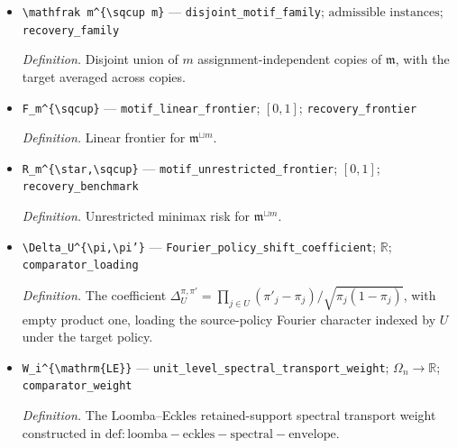 \documentclass{article}
\begin{document}
\begin{itemize}
  \par\smallskip\noindent\emph{Definition.} Positive one-motif posterior ambiguity under \(\nu_{\mathfrak m}\).
  \item \texttt{\textbackslash{}\allowbreak{}mathfrak m\textasciicircum{}\{\textbackslash{}\allowbreak{}sqcup m\}\allowbreak{}} --- \texttt{disjoint\_\allowbreak{}motif\_\allowbreak{}family}; \(\text{admissible instances}\); \texttt{recovery\_\allowbreak{}family}
  \par\smallskip\noindent\emph{Definition.} Disjoint union of \(m\) assignment-independent copies of \(\mathfrak m\), with the target averaged across copies.
  \item \texttt{F\_\allowbreak{}m\textasciicircum{}\{\textbackslash{}\allowbreak{}sqcup\}\allowbreak{}} --- \texttt{motif\_\allowbreak{}linear\_\allowbreak{}frontier}; \([0,1]\); \texttt{recovery\_\allowbreak{}frontier}
  \par\smallskip\noindent\emph{Definition.} Linear frontier for \(\mathfrak m^{\sqcup m}\).
  \item \texttt{R\_\allowbreak{}m\textasciicircum{}\{\textbackslash{}\allowbreak{}star,\allowbreak{}\textbackslash{}\allowbreak{}sqcup\}\allowbreak{}} --- \texttt{motif\_\allowbreak{}unrestricted\_\allowbreak{}frontier}; \([0,1]\); \texttt{recovery\_\allowbreak{}benchmark}
  \par\smallskip\noindent\emph{Definition.} Unrestricted minimax risk for \(\mathfrak m^{\sqcup m}\).
  \item \texttt{\textbackslash{}\allowbreak{}Delta\_\allowbreak{}U\textasciicircum{}\{\textbackslash{}\allowbreak{}pi,\allowbreak{}\textbackslash{}\allowbreak{}pi'\}\allowbreak{}} --- \texttt{Fourier\_\allowbreak{}policy\_\allowbreak{}shift\_\allowbreak{}coefficient}; \(\mathbb R\); \texttt{comparator\_\allowbreak{}loading}
  \par\smallskip\noindent\emph{Definition.} The coefficient \(\Delta_U^{\pi,\pi'}=\prod_{j\in U}(\pi'_j-\pi_j)/\sqrt{\pi_j(1-\pi_j)}\), with empty product one, loading the source-policy Fourier character indexed by \(U\) under the target policy.
  \item \texttt{W\_\allowbreak{}i\textasciicircum{}\{\textbackslash{}\allowbreak{}mathrm\{LE\}\allowbreak{}\}\allowbreak{}} --- \texttt{unit\_\allowbreak{}level\_\allowbreak{}spectral\_\allowbreak{}transport\_\allowbreak{}weight}; \(\Omega_n\to\mathbb R\); \texttt{comparator\_\allowbreak{}weight}
  \par\smallskip\noindent\emph{Definition.} The Loomba--Eckles retained-support spectral transport weight constructed in \(\mathrm{def:loomba-eckles-spectral-envelope}\).

\end{itemize}
\end{document}
